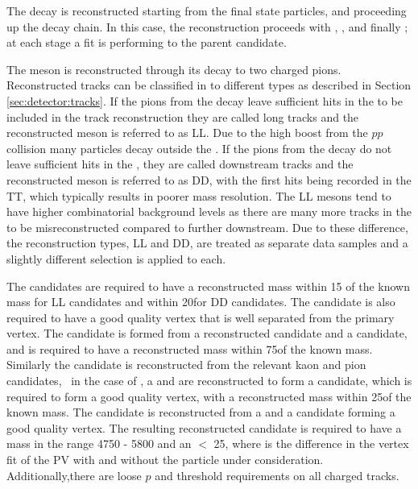 The decay is reconstructed starting from the final state particles, and proceeding up the decay chain. In this case, the reconstruction proceeds with \decay{\KS}{\pim\pim}, \decay{\Kstarm}{\KS\pim},  and finally \decay{\Bm}{\D\Kstarm}; at each stage a fit is performing to the parent candidate.

The \KS meson is reconstructed through its decay to two charged pions. Reconstructed tracks can be classified in to different types as described in Section \ref{sec:detector:tracks}. If the pions from the \KS decay leave sufficient hits in the \velo to be included in the track reconstruction they are called long tracks and the reconstructed \KS meson is referred to as LL. Due to the high boost from the $pp$ collision many \KS particles decay outside the \velo. If the pions from the \KS decay do not leave sufficient hits in the \velo, they are called downstream tracks and the reconstructed \KS meson is referred to as DD, with the first hits being recorded in the TT, which typically results in poorer mass resolution. The LL \KS mesons tend to have higher combinatorial background levels as there are many more tracks in the \velo to be misreconstructed compared to further downstream. Due to these difference, the \KS reconstruction types, LL and DD, are treated as separate data samples and a slightly different selection is applied to each.

The \KS candidates are required to have a reconstructed mass within 15 \mevcc of the known mass for LL \KS candidates and within 20\mevcc for DD \KS candidates. The \KS candidate is also required to have a good quality vertex that is well separated from the primary vertex. The \Kstarm candidate is formed from a reconstructed \KS candidate and a \pim candidate, and is required to have a reconstructed mass within 75\mev of the known \Kstarm mass. Similarly the \Dz candidate is reconstructed from the relevant kaon and pion candidates, \eg~in the case of \kpi, a \Km and \pip are reconstructed to form a \Dz candidate, which is required to form a good quality vertex, with a reconstructed mass within 25\mevcc of the known \Dz mass. The \Bm candidate is reconstructed from a \Dz and a \KS candidate forming a good quality vertex. The resulting reconstructed \Bm candidate is required to have a mass in the range 4750 - 5800 \mevcc and an \chisqip $<$ 25, where \chisqip is the difference in the vertex fit \chisq of the PV with and without the particle under consideration. Additionally,there are loose $p$ and \pt threshold requirements on all charged tracks.

